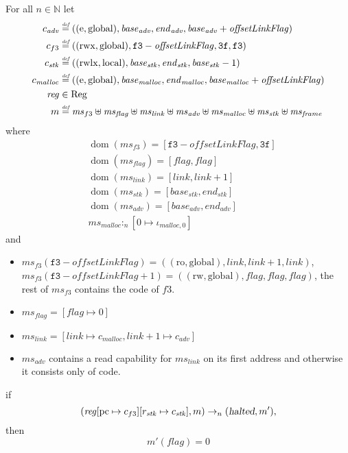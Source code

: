 \documentclass[a4paper]{article}
\newcommand{\update}[2]{[#1 \mapsto #2]}
\newcommand{\defeq}{\stackrel{\textit{\tiny{def}}}{=}}
\DeclareMathOperator{\dom}{dom}
\newcommand{\var}[1]{\mathit{#1}}
\newcommand{\hs}{\var{ms}}
\newcommand{\ms}{\hs}
\newcommand{\pcreg}{\mathrm{pc}}
\newcommand{\start}{\var{base}}
\newcommand{\addrend}{\var{end}}
\newcommand{\reg}{\var{reg}}
\newcommand{\heap}{\var{mem}}
\newcommand{\adv}{\var{adv}}
\newcommand{\link}{\var{link}}
\newcommand{\stk}{\var{stk}}
\newcommand{\flag}{\var{flag}}
\newcommand{\olf}{\var{offsetLinkFlag}}
\newcommand{\halted}{\textsl{halted}}
\newcommand{\heapSat}[3][\heap]{#1 :_{#2} #3}
\newcommand{\codelabel}[1]{\mathit{#1}}
\newcommand{\malloc}{\codelabel{malloc}}
\newcommand{\plaindom}[1]{\mathrm{#1}}
\newcommand{\Regs}{\plaindom{Reg}}
\newcommand{\nats}{\mathbb{N}}
\newcommand{\plainperm}[1]{\mathrm{#1}}
\newcommand{\readonly}{\plainperm{ro}}
\newcommand{\readwrite}{\plainperm{rw}}
\newcommand{\entry}{\plainperm{e}}
\newcommand{\rwx}{\plainperm{rwx}}
\newcommand{\rwlx}{\plainperm{rwlx}}
\newcommand{\local}{\plainperm{local}}
\newcommand{\glob}{\plainperm{global}}
\newcommand{\step}[1][]{\rightarrow_{#1}}
\begin{document}
\begin{lemma}
\begin{lemma}
  \label{lem:correctness-f3}
  For all $n \in \nats$
  let
  \begin{align*}
    c_{\var{adv}} & \defeq ((\entry,\glob),\start_{\adv},\addrend_{\adv},\start_{\adv}+\olf) \\
    c_{f3} & \defeq ((\rwx,\glob),\mathtt{f3}-\olf,\mathtt{3f},\mathtt{f3}) \\
    c_{\var{stk}} & \defeq ((\rwlx,\local),\start_\stk,\addrend_\stk,\start_\stk-1) \\
    c_\malloc & \defeq ((\entry,\glob),\start_\malloc,\addrend_\malloc,\start_\malloc+\olf) \\
    \reg & \in \Regs \\
    m & \defeq \hs_{f3} \uplus 
        \hs_\flag \uplus                
        \ms_{\var{link}} \uplus 
        \hs_\adv \uplus 
        \ms_{\malloc} \uplus 
        \ms_{\var{stk}} \uplus
        \ms_{\var{frame}} 
  \end{align*}
  where 
  \begin{align*}
    &\dom(\hs_{f3}) = [\mathtt{f3}-\olf,\mathtt{3f}] \\
    &\dom(\hs_\flag) = [\flag,\flag] \\
    &\dom(\ms_\link) = [\link,\link+1]\\
    &\dom(\ms_\stk) = [\start_\stk, \addrend_\stk]\\
    &\dom(\hs_{\adv}) = [\start_\adv,\addrend_\adv] \\
    &\heapSat[\hs_{\malloc}]{n}{[0 \mapsto \iota_{\malloc,0}]}
  \end{align*}
  and
  \begin{itemize}
  \item $\ms_{f3}(\mathtt{f3}-\olf) = ((\readonly,\glob),\link,\link+1,\link)$, $\ms_{f3}(\mathtt{f3}-\olf+1) = ((\readwrite,\glob),\flag,\flag,\flag)$, the rest of $\hs_{f3}$ contains the code of $f3$.
  \item $\ms_\flag = [\flag \mapsto 0]$
  \item $\ms_{\var{link}} = [\var{link} \mapsto c_\malloc, \var{link} + 1 \mapsto c_\adv]$
  \item $\hs_\adv$ contains a read capability for $\hs_\link$ on its first address and otherwise it consists only of code.
  \end{itemize}
  if 
  \[
    (\reg\update{\pcreg}{c_{f3}}\update{r_\stk}{c_\stk},m) \step[n] (\halted,m'),
  \]
  then
  \[
    m'(\flag) = 0
  \]  
\end{lemma}

\end{lemma}
\end{document}

